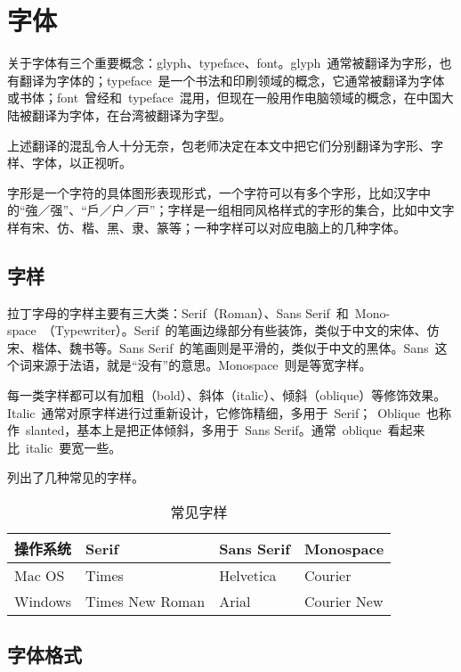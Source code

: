 \chapter{字体}

关于字体有三个重要概念：glyph、typeface、font。glyph~通常被翻译为字形，也有翻译为字体的；typeface~是一个书法和印刷领域的概念，它通常被翻译为字体或书体；font~曾经和~typeface~混用，但现在一般用作电脑领域的概念，在中国大陆被翻译为字体，在台湾被翻译为字型。

上述翻译的混乱令人十分无奈，包老师决定在本文中把它们分别翻译为字形、字样、字体，以正视听。

字形是一个字符的具体图形表现形式，一个字符可以有多个字形，比如汉字中的“強／强”、“戶／户／戸”；字样是一组相同风格样式的字形的集合，比如中文字样有宋、仿、楷、黑、隶、篆等；一种字样可以对应电脑上的几种字体。

\section{字样}
\label{sec:typeface}
拉丁字母的字样主要有三大类：Serif（Roman）、Sans Serif~和~Mono-space~（Typewriter）。Serif~的笔画边缘部分有些装饰，类似于中文的宋体、仿宋、楷体、魏书等。Sans Serif~的笔画则是平滑的，类似于中文的黑体。Sans~这个词来源于法语，就是“没有”的意思。Monospace~则是等宽字样。

每一类字样都可以有加粗（bold）、斜体（italic）、倾斜（oblique）等修饰效果。Italic~通常对原字样进行过重新设计，它修饰精细，多用于~Serif；~Oblique~也称作~slanted，基本上是把正体倾斜，多用于~Sans Serif。通常~oblique~看起来比~italic~要宽一些。

列出了几种常见的字样。

\begin{table}[htbp]
\caption{常见字样}
\label{tab:typeface}
\centering
\begin{tabular}{llll}
    \toprule
    操作系统 & Serif           & Sans Serif & Monospace \\
    \midrule
    Mac OS   & Times           & Helvetica  & Courier \\
    Windows  & Times New Roman & Arial      & Courier New \\
    \bottomrule
\end{tabular}
\end{table}

\section{字体格式}
\label{sec:font}

